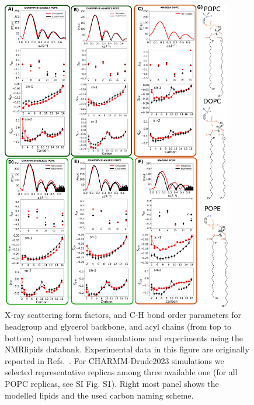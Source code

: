 \documentclass[journal=jctcce,manuscript=article,layout=singlecolumn]{achemso}
\begin{document}
\begin{figure}[!p]
    \centering
    \includegraphics[width=0.9\textwidth]{Figures/quality.pdf}
    \caption{X-ray scattering form factors, and C-H bond order parameters for headgroup and glycerol backbone, and acyl chains (from top to bottom) compared between simulations and experiments using the NMRlipids databank. Experimental data in this figure are originally reported in Refs.~. For CHARMM-Drude2023 simulations we selected representative replicas among three available one (for all POPC replicas, see SI Fig. S1). Right most panel shows the modelled lipids and the used carbon naming scheme.}
    \label{fig:order_parameters}

\end{figure}
\end{document}
